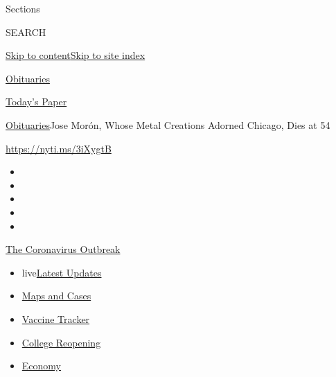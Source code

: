 Sections

SEARCH

\protect\hyperlink{site-content}{Skip to
content}\protect\hyperlink{site-index}{Skip to site index}

\href{https://www.nytimes3xbfgragh.onion/section/obituaries}{Obituaries}

\href{https://myaccount.nytimes3xbfgragh.onion/auth/login?response_type=cookie\&client_id=vi}{}

\href{https://www.nytimes3xbfgragh.onion/section/todayspaper}{Today's
Paper}

\href{/section/obituaries}{Obituaries}\textbar{}Jose Morón, Whose Metal
Creations Adorned Chicago, Dies at 54

\url{https://nyti.ms/3iXygtB}

\begin{itemize}
\item
\item
\item
\item
\item
\end{itemize}

\href{https://www.nytimes3xbfgragh.onion/news-event/coronavirus?action=click\&pgtype=Article\&state=default\&region=TOP_BANNER\&context=storylines_menu}{The
Coronavirus Outbreak}

\begin{itemize}
\tightlist
\item
  live\href{https://www.nytimes3xbfgragh.onion/2020/08/04/world/coronavirus-covid-19.html?action=click\&pgtype=Article\&state=default\&region=TOP_BANNER\&context=storylines_menu}{Latest
  Updates}
\item
  \href{https://www.nytimes3xbfgragh.onion/interactive/2020/us/coronavirus-us-cases.html?action=click\&pgtype=Article\&state=default\&region=TOP_BANNER\&context=storylines_menu}{Maps
  and Cases}
\item
  \href{https://www.nytimes3xbfgragh.onion/interactive/2020/science/coronavirus-vaccine-tracker.html?action=click\&pgtype=Article\&state=default\&region=TOP_BANNER\&context=storylines_menu}{Vaccine
  Tracker}
\item
  \href{https://www.nytimes3xbfgragh.onion/2020/08/02/us/covid-college-reopening.html?action=click\&pgtype=Article\&state=default\&region=TOP_BANNER\&context=storylines_menu}{College
  Reopening}
\item
  \href{https://www.nytimes3xbfgragh.onion/live/2020/08/03/business/stock-market-today-coronavirus?action=click\&pgtype=Article\&state=default\&region=TOP_BANNER\&context=storylines_menu}{Economy}
\end{itemize}


